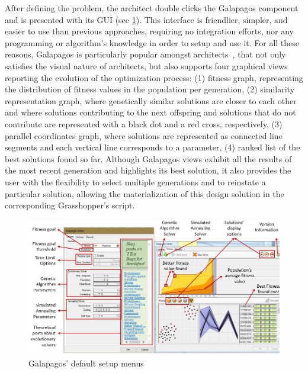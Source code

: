 	After defining the problem, the architect double clicks the Galapagos component and is presented with its \ac{GUI} (see \cref{fig:galapagossetup}). This interface is friendlier, simpler, and easier to use than previous approaches, requiring no integration efforts, nor any programming or algorithm's knowledge in order to setup and use it. For all these reasons, Galapagos is particularly popular amongst architects~\cite{Wortmann2017ADO}, that not only satisfies the visual nature of architects, but also supports four graphical views reporting the evolution of the optimization process: (1) fitness graph, representing the distribution of fitness values in the population per generation, (2) similarity representation graph, where genetically similar solutions are closer to each other and where solutions contributing to the next offspring and solutions that do not contribute are represented with a black dot and a red cross, respectively, (3) parallel coordinates graph, where solutions are represented as connected line segments and each vertical line corresponds to a parameter, (4) ranked list of the best solutions found so far. Although Galapagos views exhibit all the results of the most recent generation and highlights its best solution, it also provides the user with the flexibility to select multiple generations and to reinstate a particular solution, allowing the materialization of this design solution in the corresponding Grasshopper's script.
	
\begin{figure}
\centering
\includegraphics[width=\textwidth]{Images/Background/Galapagos/Galapagos-setup-2.PNG}
\caption[Galapagos Setup Menus]{Galapagos' default setup menus}
\label{fig:galapagossetup}
\end{figure}

